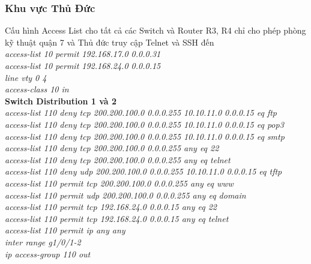 \documentclass[a4paper, 12pt]{article}
\begin{document}
\subsubsection{Khu vực Thủ Đức}
\hspace*{1cm}Cấu hình Access List cho tất cả các Switch và Router R3, R4 chỉ cho phép phòng kỹ thuật quận 7 và Thủ đức truy cập Telnet và SSH đến\\
\hspace*{2cm}\textit{access-list 10 permit 192.168.17.0 0.0.0.31\\
\hspace*{2cm}access-list 10 permit 192.168.24.0 0.0.0.15\\
\hspace*{2cm}line vty 0 4\\
\hspace*{2cm}access-class 10 in\\}
\hspace*{1cm}\textbf{Switch Distribution 1 và 2}\\
\hspace*{2cm}\textit{access-list 110 deny tcp 200.200.100.0 0.0.0.255 10.10.11.0 0.0.0.15 eq ftp\\
\hspace*{2cm}access-list 110 deny tcp 200.200.100.0 0.0.0.255 10.10.11.0 0.0.0.15 eq pop3\\
\hspace*{2cm}access-list 110 deny tcp 200.200.100.0 0.0.0.255 10.10.11.0 0.0.0.15 eq smtp\\
\hspace*{2cm}access-list 110 deny tcp 200.200.100.0 0.0.0.255 any eq 22\\
\hspace*{2cm}access-list 110 deny tcp 200.200.100.0 0.0.0.255 any eq telnet\\
\hspace*{2cm}access-list 110 deny udp 200.200.100.0 0.0.0.255 10.10.11.0 0.0.0.15 eq tftp\\
\hspace*{2cm}access-list 110 permit tcp 200.200.100.0 0.0.0.255 any eq www\\
\hspace*{2cm}access-list 110 permit udp 200.200.100.0 0.0.0.255 any eq domain\\
\hspace*{2cm}access-list 110 permit tcp 192.168.24.0 0.0.0.15 any eq 22\\
\hspace*{2cm}access-list 110 permit tcp 192.168.24.0 0.0.0.15 any eq telnet\\
\hspace*{2cm}access-list 110 permit ip any any\\
\hspace*{2cm}inter range g1/0/1-2\\
\hspace*{2cm}ip access-group 110 out \\ }
\end{document}
